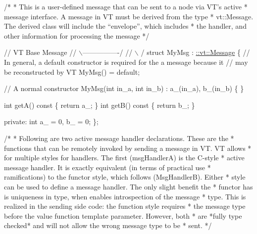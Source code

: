 \begin{DoxyCodeInclude}
\textcolor{comment}{/*}
\textcolor{comment}{ * This is a user-defined message that can be sent to a node via VT's active}
\textcolor{comment}{ * message interface. A message in VT must be derived from the type}
\textcolor{comment}{ * vt::Message. The derived class will include the ``envelope'', which includes}
\textcolor{comment}{ * the handler, and other information for processing the message}
\textcolor{comment}{ */}

\textcolor{comment}{//            VT Base Message}
\textcolor{comment}{//           \(\backslash\)----------------/}
\textcolor{comment}{//            \(\backslash\)              /}
\textcolor{keyword}{struct }MyMsg : \hyperlink{structvt_1_1messaging_1_1_active_msg}{::vt::Message} \{
  \textcolor{comment}{// In general, a default constructor is required for the a message because it}
  \textcolor{comment}{// may be reconstructed by VT}
  MyMsg() = \textcolor{keywordflow}{default};

  \textcolor{comment}{// A normal constructor}
  MyMsg(\textcolor{keywordtype}{int} in\_a, \textcolor{keywordtype}{int} in\_b) : a\_(in\_a), b\_(in\_b) \{ \}

  \textcolor{keywordtype}{int} getA()\textcolor{keyword}{ const }\{ \textcolor{keywordflow}{return} a\_; \}
  \textcolor{keywordtype}{int} getB()\textcolor{keyword}{ const }\{ \textcolor{keywordflow}{return} b\_; \}

\textcolor{keyword}{private}:
  \textcolor{keywordtype}{int} a\_ = 0, b\_ = 0;
\};

\textcolor{comment}{/*}
\textcolor{comment}{ * Following are two active message handler declarations. These are the}
\textcolor{comment}{ * functions that can be remotely invoked by sending a message in VT. VT allows}
\textcolor{comment}{ * for multiple styles for handlers. The first (msgHandlerA) is the C-style}
\textcolor{comment}{ * active message handler. It is exactly equivalent (in terms of practical use}
\textcolor{comment}{ * ramifications) to the functor style, which follows (MsgHandlerB). Either}
\textcolor{comment}{ * style can be used to define a message handler. The only slight benefit the}
\textcolor{comment}{ * functor has is uniqueness in type, when enables introspection of the message}
\textcolor{comment}{ * type. This is realized in the sending side code: the function style requires}
\textcolor{comment}{ * the message type before the value function template parameter. However, both}
\textcolor{comment}{ * are *fully type checked* and will not allow the wrong message type to be}
\textcolor{comment}{ * sent.}
\textcolor{comment}{ */}


\end{DoxyCodeInclude}
